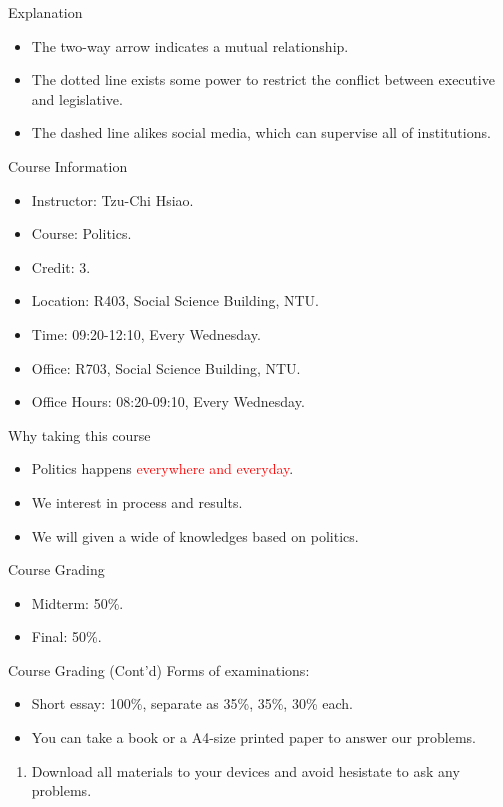 \documentclass{beamer}
\begin{document}
\begin{frame}{Explanation}
\begin{itemize}
\item The two-way arrow indicates a mutual relationship.
\item The dotted line exists some power to restrict the conflict between executive and legislative.
\item The dashed line alikes social media, which can supervise all of institutions.
\end{itemize}
\end{frame}
\begin{frame}{Course Information}
\begin{itemize}
\item Instructor: Tzu-Chi Hsiao.
\item Course: Politics.
\item Credit: 3.
\item Location: R403, Social Science Building, NTU.
\item Time: 09:20-12:10, Every Wednesday.
\item Office: R703, Social Science Building, NTU.
\item Office Hours: 08:20-09:10, Every Wednesday.
\end{itemize}
\end{frame}
\begin{frame}{Why taking this course}
\begin{itemize}
\item Politics happens \textcolor{red}{everywhere and everyday}.
\item We interest in process and results.
\item We will given a wide of knowledges based on politics.
\end{itemize}
\end{frame}
\begin{frame}{Course Grading}
\begin{itemize}
\item Midterm: 50\%.
\item Final: 50\%.
\end{itemize}
\end{frame}
\begin{frame}{Course Grading (Cont'd)}
Forms of examinations:
\begin{itemize}
\item Short essay: 100\%, separate as 35\%, 35\%, 30\% each.
\item You can take a book or a A4-size printed paper to answer our problems.
\end{itemize}
\begin{enumerate}
\item Download all materials to your devices and avoid hesistate to ask any problems.
\end{enumerate}
\end{frame}
\end{document}
